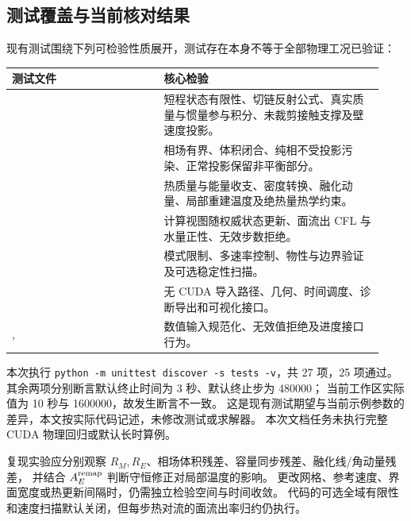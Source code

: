 \subsection{测试覆盖与当前核对结果}
现有测试围绕下列可检验性质展开，测试存在本身不等于全部物理工况已验证：
\begin{longtable}{L{0.38\linewidth}L{0.55\linewidth}}
\toprule 测试文件 & 核心检验\\\midrule
\endhead
{} & 短程状态有限性、切链反射公式、真实质量与惯量参与积分、未裁剪接触支撑及壁速度投影。\\
 & 相场有界、体积闭合、纯相不受投影污染、正常投影保留非平衡部分。\\
 & 热质量与能量收支、密度转换、融化动量、局部重建温度及绝热量热学约束。\\
 & 计算视图随权威状态更新、面流出 CFL 与水量正性、无效步数拒绝。\\
 & 模式限制、多速率控制、物性与边界验证及可选稳定性扫描。\\
 & 无 CUDA 导入路径、几何、时间调度、诊断导出和可视化接口。\\
,  & 数值输入规范化、无效值拒绝及进度接口行为。\\
\bottomrule
\end{longtable}
本次执行 \texttt{python -m unittest discover -s tests -v}，共 27 项，25 项通过。
其余两项分别断言默认终止时间为 3 秒、默认终止步为 480000；
当前工作区实际值为 10 秒与 1600000，故发生断言不一致。
这是现有测试期望与当前示例参数的差异，本文按实际代码记述，未修改测试或求解器。
本次文档任务未执行完整 CUDA 物理回归或默认长时算例。

复现实验应分别观察 $R_M,R_E$、相场体积残差、容量同步残差、融化线/角动量残差，
并结合 $A_E^{\rm remap}$ 判断守恒修正对局部温度的影响。
更改网格、参考速度、界面宽度或热更新间隔时，仍需独立检验空间与时间收敛。
代码的可选全域有限性和速度扫描默认关闭，但每步热对流的面流出率归约仍执行。

